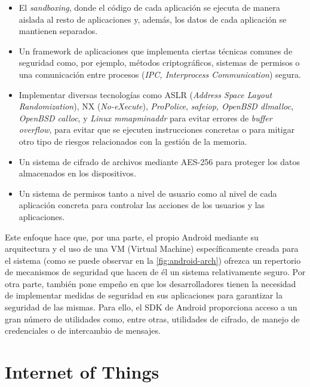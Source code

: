 \begin{itemize}
	\item El \emph{sandboxing}, donde el código de cada aplicación se ejecuta de manera aislada al resto de aplicaciones y, además, los datos de cada aplicación se mantienen separados. 
	\item Un framework de aplicaciones que implementa ciertas técnicas comunes de seguridad como, por ejemplo, métodos criptográficos, sistemas de permisos o una comunicación entre procesos (\textit{IPC, Interprocess Communication}) segura.	
	\item Implementar diversas tecnologías como ASLR (\textit{Address Space Layout Randomization}), NX (\textit{No-eXecute}), \textit{ProPolice}, \textit{safe\textunderscore iop, OpenBSD dlmalloc}, \textit{OpenBSD calloc}, y \textit{Linux mmap\textunderscore min\textunderscore addr} para evitar errores de \textit{buffer overflow}, para evitar que se ejecuten instrucciones concretas o para mitigar otro tipo de riesgos relacionados con la gestión de la memoria.
	\item Un sistema de cifrado de archivos mediante AES-256 para proteger los datos almacenados en los dispositivos.
	\item Un sistema de permisos tanto a nivel de usuario como al nivel de cada aplicación concreta para controlar las acciones de los usuarios y las aplicaciones.
\end{itemize}

Este enfoque hace que, por una parte, el propio Android mediante su arquitectura y el uso de una VM (Virtual Machine) específicamente creada para el sistema (como se puede observar en la \autoref{fig:android-arch}) ofrezca un repertorio de mecanismos de seguridad que hacen de él un sistema relativamente seguro. Por otra parte, también pone empeño en que los desarrolladores tienen la necesidad de implementar medidas de seguridad en sus aplicaciones para garantizar la seguridad de las mismas. Para ello, el SDK de Android proporciona acceso a un gran número de utilidades como, entre otras, utilidades de cifrado, de manejo de credenciales o de intercambio de mensajes.


\section{Internet of Things}

